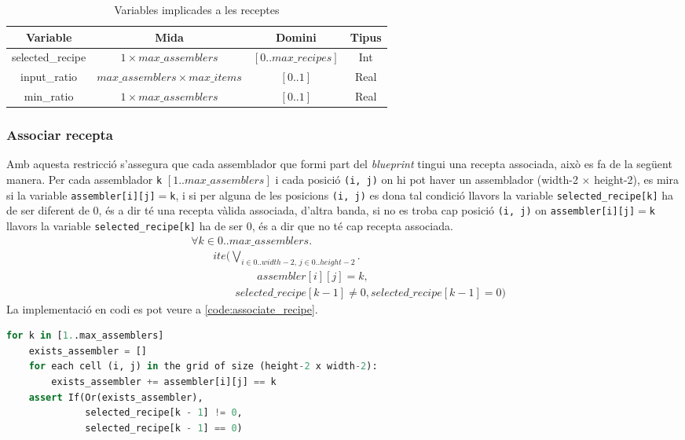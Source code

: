 \begin{table}[h]
    \centering
    \begin{tabular}{|c|c|c|c|}
    \hline
    \textbf{Variable} & \textbf{Mida} & \textbf{Domini} & \textbf{Tipus}\\
    \hline
    selected\_recipe & $1 \times max\_assemblers$ & $[0..max\_recipes]$ & Int\\
    \hline
    input\_ratio & $max\_assemblers \times max\_items$ & $[0..1]$ & Real\\
    \hline
    min\_ratio & $1 \times max\_assemblers$ & $[0..1]$ & Real\\
    \hline
    \end{tabular}
    \caption{Variables implicades a les receptes}
    \label{recipe-variables}
\end{table}

\subsubsection{Associar recepta}
Amb aquesta restricció s'assegura que cada assemblador que formi part del \textit{blueprint} tingui una recepta associada, això es fa de la següent manera. Per cada assemblador \lstinline{k} $[1..max\_assemblers]$ i cada posició \lstinline{(i, j)} on hi pot haver un assemblador (width-2 $\times$ height-2), es mira si la variable \lstinline{assembler[i][j]}$=$\lstinline{k}, i si per alguna de les posicions \lstinline{(i, j)} es dona tal condició llavors la variable \lstinline{selected_recipe[k]} ha de ser diferent de 0, és a dir té una recepta vàlida associada, d'altra banda, si no es troba cap posició \lstinline{(i, j)} on \lstinline{assembler[i][j]}$=$\lstinline{k} llavors la variable \lstinline{selected_recipe[k]} ha de ser 0, és a dir que no té cap recepta associada.
\begin{align*}
    &\forall k \in 0..max\_assemblers.\\
    &\qquad ite\Big(\bigvee_{i \in 0..width-2,\,j \in 0..height-2}.\\
    &\qquad \qquad \qquad assembler[i][j]=k,\\
    &\qquad \qquad selected\_recipe[k-1] \neq 0, selected\_recipe[k-1]=0\Big)
\end{align*}
La implementació en codi es pot veure a \ref{code:associate_recipe}.

\begin{lstlisting}[language=Python, caption=Associate Recipe, label=code:associate_recipe]
for k in [1..max_assemblers]
    exists_assembler = []
    for each cell (i, j) in the grid of size (height-2 x width-2):
        exists_assembler += assembler[i][j] == k
    assert If(Or(exists_assembler),
              selected_recipe[k - 1] != 0,
              selected_recipe[k - 1] == 0)
\end{lstlisting}

